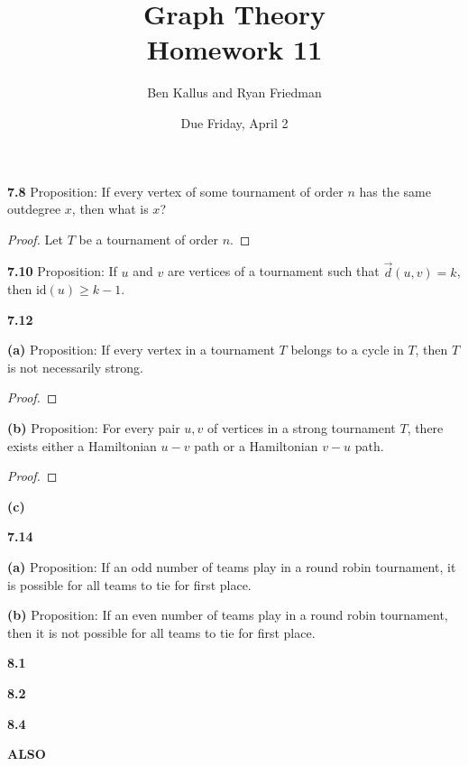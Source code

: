 \documentclass[12pt]{article}
\title{Graph Theory \\ Homework 11}
\author{Ben Kallus and Ryan Friedman}
\date{Due Friday, April 2}
\newcommand{\id}{\text{id}}
\begin{document}
\maketitle

\noindent\textbf{7.8} Proposition: If every vertex of some tournament of order $n$ has the same outdegree $x$, then what is $x$?
\begin{proof}
	Let $T$ be a tournament of order $n$.
\end{proof}

\newpage\noindent\textbf{7.10} Proposition: If $u$ and $v$ are vertices of a tournament such that $\vec{d}(u,v) = k$, then $\id(u) \geq k - 1$.

	

\newpage\noindent\textbf{7.12}

\textbf{(a)} Proposition: If every vertex in a tournament $T$ belongs to a cycle in $T$, then $T$ is not necessarily strong.
\begin{proof}
\end{proof}

\textbf{(b)} Proposition: For every pair $u,v$ of vertices in a strong tournament $T$, there exists either a Hamiltonian $u-v$ path or a Hamiltonian $v-u$ path.
\begin{proof}
\end{proof}

\textbf{(c)}
	

\newpage\noindent\textbf{7.14}

\textbf{(a)} Proposition: If an odd number of teams play in a round robin tournament, it is possible for all teams to tie for first place.
	
\textbf{(b)} Proposition: If an even number of teams play in a round robin tournament, then it is not possible for all teams to tie for first place.
	
\newpage\noindent\textbf{8.1}

	

\newpage\noindent\textbf{8.2}

	

\newpage\noindent\textbf{8.4}

	

\newpage\noindent\textbf{ALSO}

	
\end{document}
